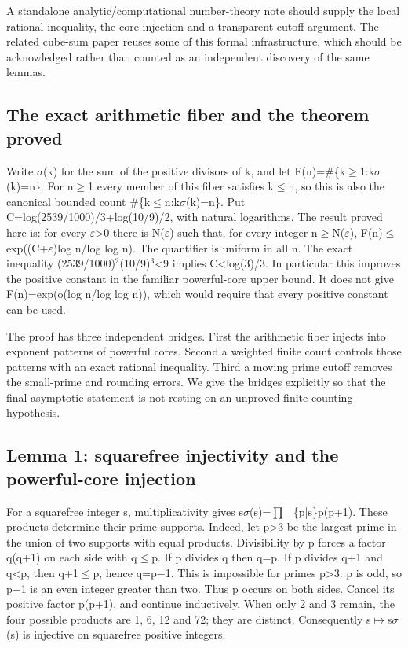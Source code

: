 \documentclass[11pt,a4paper]{article}
\begin{document}
A standalone analytic/computational number-theory note should supply the local rational inequality, the core injection and a transparent cutoff argument. The related cube-sum paper reuses some of this formal infrastructure, which should be acknowledged rather than counted as an independent discovery of the same lemmas.

\subsection{The exact arithmetic fiber and the theorem proved}
Write \ensuremath{\sigma}(k) for the sum of the positive divisors of k, and let F(n)=\#\{k\ensuremath{\geq}1:k\ensuremath{\sigma}(k)=n\}. For n\ensuremath{\geq}1 every member of this fiber satisfies k\ensuremath{\leq}n, so this is also the canonical bounded count \#\{k\ensuremath{\leq}n:k\ensuremath{\sigma}(k)=n\}. Put C=log(2539/1000)/3+log(10/9)/2, with natural logarithms. The result proved here is: for every \ensuremath{\varepsilon}>0 there is N(\ensuremath{\varepsilon}) such that, for every integer n\ensuremath{\geq}N(\ensuremath{\varepsilon}), F(n)\ensuremath{\leq}exp((C+\ensuremath{\varepsilon})log n/log log n). The quantifier is uniform in all n. The exact inequality (2539/1000)\ensuremath{^2}(10/9)\ensuremath{^3}<9 implies C<log(3)/3. In particular this improves the positive constant in the familiar powerful-core upper bound. It does not give F(n)=exp(o(log n/log log n)), which would require that every positive constant can be used.

The proof has three independent bridges. First the arithmetic fiber injects into exponent patterns of powerful cores. Second a weighted finite count controls those patterns with an exact rational inequality. Third a moving prime cutoff removes the small-prime and rounding errors. We give the bridges explicitly so that the final asymptotic statement is not resting on an unproved finite-counting hypothesis.

\subsection{Lemma 1: squarefree injectivity and the powerful-core injection}
For a squarefree integer s, multiplicativity gives s\ensuremath{\sigma}(s)=\ensuremath{\prod}\_\{p|s\}p(p+1). These products determine their prime supports. Indeed, let p>3 be the largest prime in the union of two supports with equal products. Divisibility by p forces a factor q(q+1) on each side with q\ensuremath{\leq}p. If p divides q then q=p. If p divides q+1 and q<p, then q+1\ensuremath{\leq}p, hence q=p\ensuremath{-}1. This is impossible for primes p>3: p is odd, so p\ensuremath{-}1 is an even integer greater than two. Thus p occurs on both sides. Cancel its positive factor p(p+1), and continue inductively. When only 2 and 3 remain, the four possible products are 1, 6, 12 and 72; they are distinct. Consequently s\ensuremath{\mapsto}s\ensuremath{\sigma}(s) is injective on squarefree positive integers.
\end{document}
